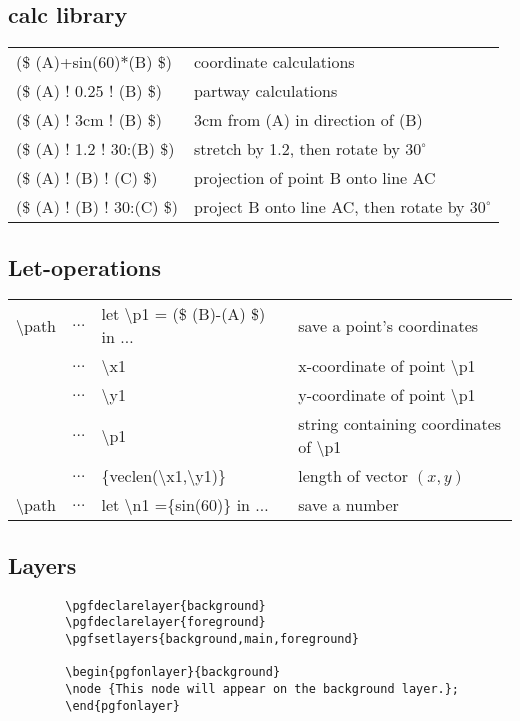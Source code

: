 \documentclass[a4paper]{article}
\begin{document}
    \subsection{calc library}
      \begin{tabular}{ll}
        (\$ (A)+{sin(60)}$*$(B) \$) & coordinate calculations\\
        (\$ (A) ! 0.25 ! (B) \$) & partway calculations\\
        (\$ (A) ! 3cm ! (B) \$) & 3cm from (A) in direction of (B)\\
        (\$ (A) ! 1.2 ! 30:(B) \$) & stretch by 1.2, then rotate by $30^\circ$ \\
        (\$ (A) ! (B) ! (C) \$) & projection of point B onto line AC \\
        (\$ (A) ! (B) ! 30:(C) \$) & project B onto line AC, then rotate by $30^\circ$
      \end{tabular}%
    \subsection{Let-operations}
      \begin{tabular}{llll}
        \textbackslash path & $\dots$ & let \textbackslash p1 = (\$ (B)-(A) \$) in $\dots$
          & save a point’s coordinates\\
        & $\dots$ & \textbackslash x1 & x-coordinate of point \textbackslash p1 \\
        & $\dots$ & \textbackslash y1 & y-coordinate of point \textbackslash p1 \\
        & $\dots$ & \textbackslash p1 & string containing coordinates of \textbackslash p1 \\
        & $\dots$ & \{veclen(\textbackslash x1,\textbackslash y1)\} & length of vector $(x,y)$\\
        \textbackslash path & $\dots$ & let \textbackslash n1 =\{sin(60)\} in $\dots$ & save a number
      \end{tabular}

    \subsection{Layers}
      \begin{verbatim}
        \pgfdeclarelayer{background}
        \pgfdeclarelayer{foreground}
        \pgfsetlayers{background,main,foreground}

        \begin{pgfonlayer}{background}
        \node {This node will appear on the background layer.};
        \end{pgfonlayer}
      \end{verbatim}
\end{document}
